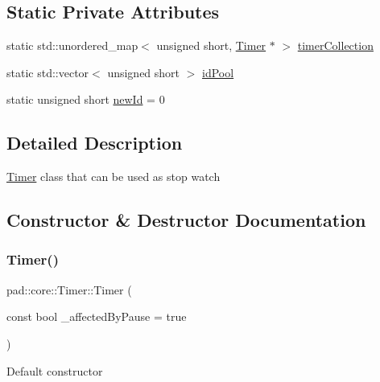 \subsection*{Static Private Attributes}
\begin{DoxyCompactItemize}
\item 
static std\+::unordered\+\_\+map$<$ unsigned short, \mbox{\hyperlink{classpad_1_1core_1_1_timer}{Timer}} $\ast$ $>$ \mbox{\hyperlink{classpad_1_1core_1_1_timer_a57359f64301ebdbd74a257ca1ce45e1c}{timer\+Collection}}
\item 
static std\+::vector$<$ unsigned short $>$ \mbox{\hyperlink{classpad_1_1core_1_1_timer_ae68b007567e905744c73a4f340f1bebe}{id\+Pool}}
\item 
static unsigned short \mbox{\hyperlink{classpad_1_1core_1_1_timer_aaa8d5b7c9776da6430af17964d3f2871}{new\+Id}} = 0
\end{DoxyCompactItemize}


\subsection{Detailed Description}
\mbox{\hyperlink{classpad_1_1core_1_1_timer}{Timer}} class that can be used as stop watch 

\subsection{Constructor \& Destructor Documentation}
\mbox{\label{classpad_1_1core_1_1_timer_a30a7706137aea9acde41ca7ee90326e3}} 
\subsubsection{\texorpdfstring{Timer()}{Timer()}}
{\footnotesize\ttfamily pad\+::core\+::\+Timer\+::\+Timer (\begin{DoxyParamCaption}\item[{const bool}]{\+\_\+affected\+By\+Pause = {\ttfamily true} }\end{DoxyParamCaption})}

Default constructor \mbox{\label{classpad_1_1core_1_1_timer_aec538febc2d52e50ad5df1b200b60d5d}} 
